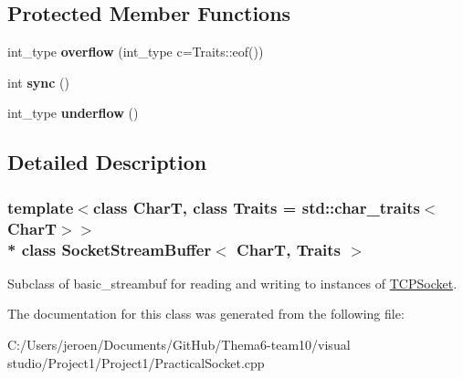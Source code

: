 \subsection*{Protected Member Functions}
\begin{DoxyCompactItemize}
\item 
int\+\_\+type {\bfseries overflow} (int\+\_\+type c=Traits\+::eof())\hypertarget{class_socket_stream_buffer_aa7fc14e235713f5cb5a2121cc5a01975}{}\label{class_socket_stream_buffer_aa7fc14e235713f5cb5a2121cc5a01975}

\item 
int {\bfseries sync} ()\hypertarget{class_socket_stream_buffer_a5268cdf1cf0c2247427e43311f5e52a8}{}\label{class_socket_stream_buffer_a5268cdf1cf0c2247427e43311f5e52a8}

\item 
int\+\_\+type {\bfseries underflow} ()\hypertarget{class_socket_stream_buffer_a6dd71af0b9306bca9624237691ffff06}{}\label{class_socket_stream_buffer_a6dd71af0b9306bca9624237691ffff06}

\end{DoxyCompactItemize}


\subsection{Detailed Description}
\subsubsection*{template$<$class CharT, class Traits = std\+::char\+\_\+traits$<$\+Char\+T$>$$>$\\*
class Socket\+Stream\+Buffer$<$ Char\+T, Traits $>$}

Subclass of basic\+\_\+streambuf for reading and writing to instances of \hyperlink{class_t_c_p_socket}{T\+C\+P\+Socket}. 

The documentation for this class was generated from the following file\+:\begin{DoxyCompactItemize}
\item 
C\+:/\+Users/jeroen/\+Documents/\+Git\+Hub/\+Thema6-\/team10/visual studio/\+Project1/\+Project1/Practical\+Socket.\+cpp\end{DoxyCompactItemize}

